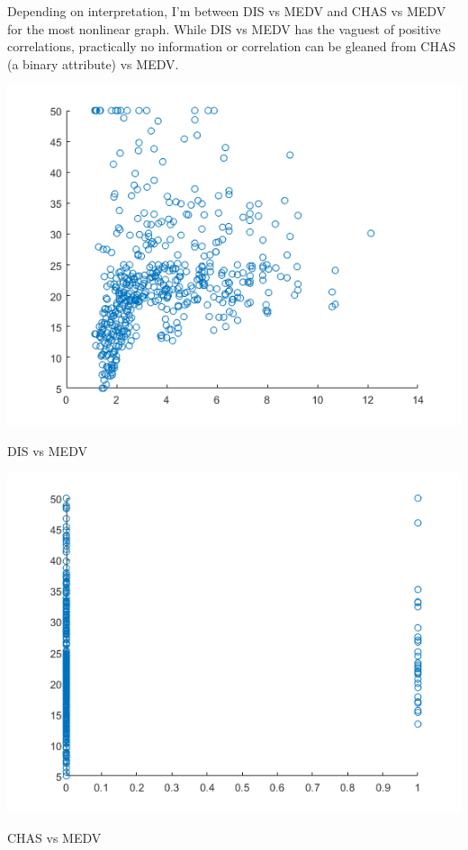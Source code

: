 \documentclass[a4paper]{article}
\begin{document}
\noindent
Depending on interpretation, I'm between DIS vs MEDV and CHAS vs MEDV for the most nonlinear graph. While DIS vs MEDV has the vaguest of positive correlations, practically no information or correlation can be gleaned from CHAS (a binary attribute) vs MEDV.

\begin{center}
    \includegraphics[scale=1]{1c-2.png}
    \caption{DIS vs MEDV}
\end{center}

\begin{center}
    \includegraphics[scale=1]{1c-3.png}
    \caption{CHAS vs MEDV}
\end{center}
\end{document}
